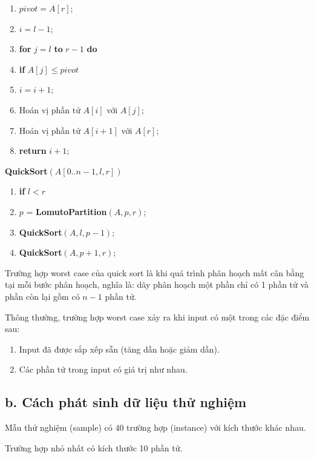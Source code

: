\documentclass[12pt, a4paper, fleqn]{article}
\begin{document}
	\begin{enumerate}
		\item $pivot = A[r]$;
		\item $i = l - 1$;
		\item \textbf{for} $j = l$ \textbf{to} $r - 1$ \textbf{do}
		\item \qquad \textbf{if} $A[j] \leq pivot$
		\item \qquad \qquad$i = i + 1$;
		\item \qquad \qquad Hoán vị phần tử $A[i]$ với $A[j]$;
		\item Hoán vị phần tử $A[i + 1]$ với $A[r]$;
		\item \textbf{return} $i + 1$; \\
	\end{enumerate}
	
	\textbf{QuickSort}$(A[0..n - 1, l, r])$
	
	\begin{enumerate}
		\item \textbf{if} $l < r$
		\item \qquad $p$ = \textbf{LomutoPartition}$(A, p, r)$;
		\item \qquad \textbf{QuickSort}$(A, l, p - 1)$;
		\item \qquad \textbf{QuickSort}$(A, p + 1, r)$;
	\end{enumerate}

	Trường hợp worst case của quick sort là khi quá trình phân hoạch mất cân bằng tại mỗi bước phân hoạch, nghĩa là: dãy phân hoạch một phần chỉ có 1 phần tử và phần còn lại gồm có $n - 1$ phần tử.
	
	Thông thường, trường hợp worst case xảy ra khi input có một trong các đặc điểm sau:
	
	\begin{enumerate}
		\item Input đã được sắp xếp sẵn (tăng dần hoặc giảm dần).
		\item Các phần tử trong input có giá trị như nhau.
	\end{enumerate}

	\subsection*{b. Cách phát sinh dữ liệu thử nghiệm}
	
	Mẫu thử nghiệm (sample) có 40 trường hợp (instance) với kích thước khác nhau.
	
	Trường hợp nhỏ nhất có kích thước 10 phần tử.
	
\end{document}
